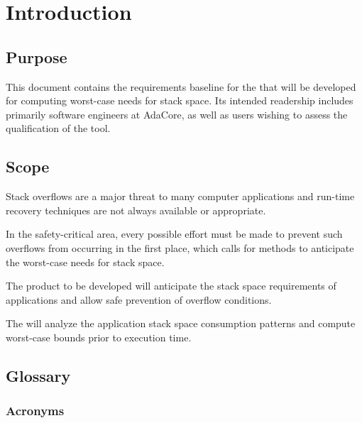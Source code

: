 \chapter{Introduction}\label{ch:introduction}
\section{Purpose}

This document contains the requirements baseline for the \ssat{} that
will be developed for computing worst-case needs for stack space. Its
intended readership includes primarily software engineers at AdaCore,
as well as users wishing to assess the qualification of the tool.

\section{Scope}

Stack overflows are a major threat to many computer applications and
run-time recovery techniques are not always available or appropriate.

In the safety-critical area, every possible effort must be made to
prevent such overflows from occurring in the first place, which calls
for methods to anticipate the worst-case needs for stack space.

The product to be developed will anticipate the stack space
requirements of applications and allow safe prevention of
overflow conditions.

The \ssat{} will analyze the application stack space consumption patterns
and compute worst-case bounds prior to execution time.

\section{Glossary}

\subsection{Acronyms}

